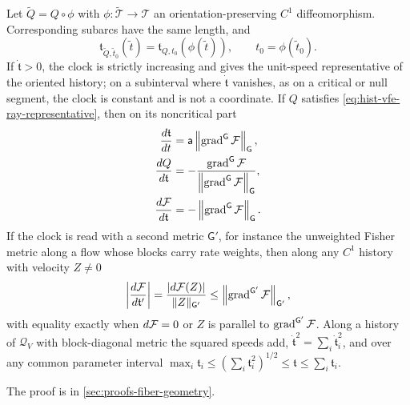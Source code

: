 Let $\widetilde Q=Q\circ\phi$ with $\phi:\widetilde{\mathcal T}\to\mathcal T$ an
orientation-preserving $C^1$ diffeomorphism.  Corresponding subarcs have the same length,
and
\begin{equation}
\mathfrak t_{\widetilde Q,\widetilde t_0}(\widetilde t)
=\mathfrak t_{Q,t_0}(\phi(\widetilde t)),
\qquad
t_0=\phi(\widetilde t_0).
\label{eq:hist-clock-reparameterization-law}
\end{equation}
If $\dot{\mathfrak t}>0$, the clock is strictly increasing and gives the unit-speed
representative of the oriented history; on a subinterval where $\dot{\mathfrak t}$
vanishes, as on a critical or null segment, the clock is constant and is not a
coordinate.  If $Q$ satisfies \eqref{eq:hist-vfe-ray-representative}, then on its
noncritical part
\begin{align}
\frac{d\mathfrak t}{dt}
&=\mathsf a\left\|\operatorname{grad}^{\mathsf G}\mathcal F\right\|_{\mathsf G},
\label{eq:hist-vfe-clock-rate}\\
\frac{dQ}{d\mathfrak t}
&=-\frac{\operatorname{grad}^{\mathsf G}\mathcal F}
{\left\|\operatorname{grad}^{\mathsf G}\mathcal F\right\|_{\mathsf G}},
\label{eq:hist-vfe-unit-tangent}\\
\frac{d\mathcal F}{d\mathfrak t}
&=-\left\|\operatorname{grad}^{\mathsf G}\mathcal F\right\|_{\mathsf G}.
\label{eq:hist-vfe-dissipation-per-length}
\end{align}
If the clock is read with a second metric $\mathsf G'$, for instance the unweighted
Fisher metric along a flow whose blocks carry rate weights, then along any $C^1$ history
with velocity $Z\ne0$
\begin{equation}
\left|\frac{d\mathcal F}{d\mathfrak t'}\right|
=\frac{|d\mathcal F(Z)|}{\lVert Z\rVert_{\mathsf G'}}
\leq\left\|\operatorname{grad}^{\mathsf G'}\mathcal F\right\|_{\mathsf G'},
\label{eq:hist-clock-metric-dissipation-bound}
\end{equation}
with equality exactly when $d\mathcal F=0$ or $Z$ is parallel to
$\operatorname{grad}^{\mathsf G'}\mathcal F$.
Along a history of $\mathcal Q_V$ with block-diagonal metric the squared speeds add,
$\dot{\mathfrak t}^2=\sum_i\dot{\mathfrak t}_i^2$, and over any common parameter interval
$\max_i\mathfrak t_i\leq(\sum_i\mathfrak t_i^2)^{1/2}\leq\mathfrak t\leq\sum_i\mathfrak
t_i$.  

The proof is in \cref{sec:proofs-fiber-geometry}.

